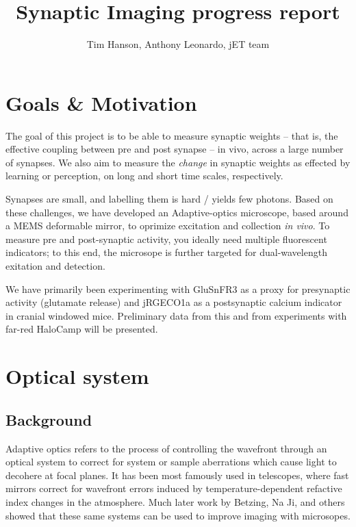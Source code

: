\documentclass[a4paper,10pt]{article}
\title{Synaptic Imaging progress report}
\author{Tim Hanson, Anthony Leonardo, jET team}
\begin{document}
\maketitle

\begin{abstract}

\end{abstract}

\section{Goals \& Motivation}

The goal of this project is to be able to measure synaptic weights -- that is, the effective coupling between pre and post synapse -- in vivo, across a large number of synapses.  We also aim to measure the \textit{change} in synaptic weights as effected by learning or perception, on long and short time scales, respectively.  

Synapses are small, and labelling them is hard / yields few photons.  Based on these challenges, we have developed an Adaptive-optics microscope, based around a MEMS deformable mirror, to oprimize excitation and collection \textit{in vivo}.  To measure pre and post-synaptic activity, you ideally need multiple fluorescent indicators; to this end, the microsope is further targeted for dual-wavelength exitation and detection.  

We have primarily been experimenting with GluSnFR3 as a proxy for presynaptic activity (glutamate release) and jRGECO1a as a postsynaptic calcium indicator in cranial windowed mice.  Preliminary data from this and from experiments with far-red HaloCamp will be presented.  

\section{Optical system}

\subsection{Background}

Adaptive optics refers to the process of controlling the wavefront through an optical system to correct for system or sample aberrations which cause light to decohere at focal planes.  It has been most famously used in telescopes, where fast mirrors correct for wavefront errors induced by temperature-dependent refactive index changes in the atmosphere.  Much later work by Betzing, Na Ji, and others showed that these same systems can be used to improve imaging with microsopes.  
\end{document}
